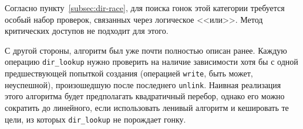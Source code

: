 Согласно пункту~\ref{subsec:dir-race}, для поиска гонок этой категории требуется особый набор проверок, связанных через логическое <<или>>. Метод критических доступов не подходит для этого.

С другой стороны, алгоритм был уже почти полностью описан ранее. Каждую операцию \texttt{dir\_lookup} нужно проверить на наличие зависимости хотя бы с одной предшествующей попыткой создания (операцией \texttt{write}, быть может, неуспешной), произошедшую после последнего \texttt{unlink}. Наивная реализация этого алгоритма будет предполагать квадратичный перебор, однако его можно сократить до линейного, если использовать ленивый алгоритм и кешировать те цели, из которых \texttt{dir\_lookup} не порождает гонку.
